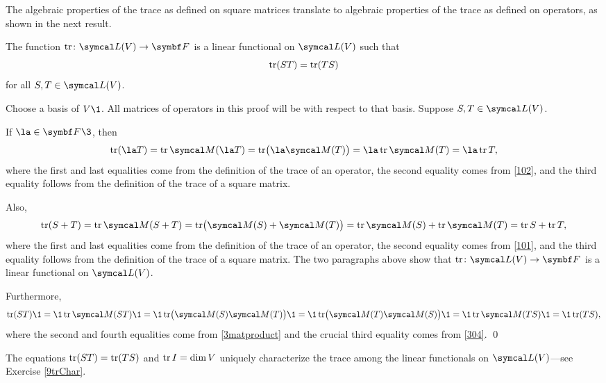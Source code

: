 The algebraic properties of the trace as defined on square matrices translate to algebraic properties of the trace as defined on operators, as shown in the next result.

%
{The function $\fun {\tr} {\L(V)} {\F{}}$ is a linear functional on $\L(V)$ such that
\[
\operatorname{tr}(ST) = \operatorname{tr}(TS)
\]
for all $S, T \in \L(V)$.}

\proof
Choose a basis of $V\1$. All matrices of operators in this proof will be with respect to that basis. Suppose $S, T \in \L(V)$.

If $\la \in \F{}\3$, then
\[
\tr(\la T) = \tr \M(\la T) = \tr \paren[\big]{ \la \M(T) } = \la \tr \M(T) = \la \tr T,
\]
where the first and last equalities come from the definition of the trace of an operator, the second equality comes from \ref{102}, and the third equality follows from the definition of the trace of a square matrix.

Also,
\[
\tr (S + T) = \tr \M(S + T)
= \tr \bigl( \M(S) + \M(T) \bigr)
= \tr \M(S) + \tr \M(T)
= \tr S + \tr T,
\]
where the first and last equalities come from the definition of the trace of an operator, the second equality comes from \ref{101}, and the third equality follows from the definition of the trace of a square matrix. The two paragraphs above show that $\fun {\tr} {\L(V)} {\F{}}$ is a linear functional on $\L(V)$.

Furthermore,
\[
\tr(ST) \1=\1 \tr \M(ST) \1=\1\tr \bigl(\M(S) \M(T) \bigr)
\1=\1 \tr \bigl(\M(T) \M(S) \bigr)
\1=\1 \tr \M(TS)
\1=\1 \tr(TS),
\]
where the second and fourth equalities come from \ref{3matproduct} and  the crucial third equality comes from \ref{304}.
\qed

The equations $\operatorname{tr}(ST) = \operatorname{tr}(TS)$ and $\operatorname{tr} I = \dim V$ uniquely characterize the trace among the linear functionals on $\L(V)$---see Exercise \ref{9trChar}.

